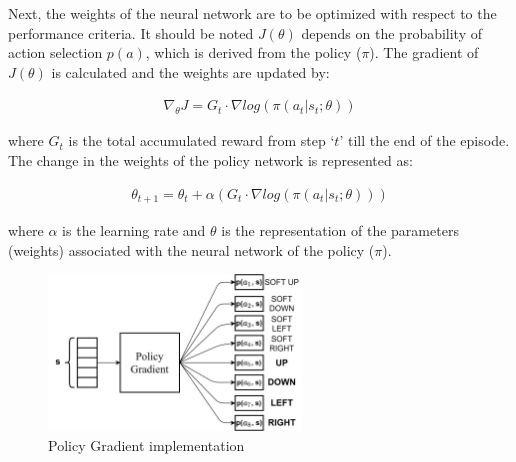 Next, the weights of the neural network are to be optimized with respect to the performance criteria. It should be noted $J(\theta)$ depends on the probability of action selection $p(a)$, which is derived from the policy ($\pi$). The gradient of $J(\theta)$ is calculated and the weights are updated by:

\begin{align}
    \nabla_{\theta} J = G_t \cdot \nabla log (\pi(a_t | s_t; \theta))
\end{align}

where $G_t$ is the total accumulated reward from step `$t$' till the end of the episode. 
The change in the weights of the policy network is represented as:

\begin{align}
    \theta_{t+1} = \theta_t + \alpha (G_t \cdot \nabla log (\pi(a_t | s_t; \theta))) \label{eqn:RL_PG_5_13}
\end{align}

where $\alpha$ is the learning rate and $\theta$ is the representation of the parameters (weights) associated with the neural network of the policy ($\pi$).

\begin{figure}[h!]
    \centering
    \includegraphics[width=0.6\textwidth]{Figures/Ch_RL/PG.png}
    \caption{Policy Gradient implementation}
    \label{fig:RL_PG}
\end{figure}
